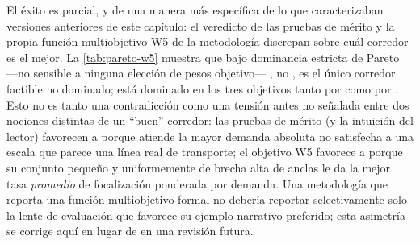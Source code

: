 El éxito es parcial, y de una manera más específica de lo que caracterizaban versiones
anteriores de este capítulo: el veredicto de las pruebas de mérito y la propia función
multiobjetivo W5 de la metodología discrepan sobre cuál corredor es el mejor. La
\cref{tab:pareto-w5} muestra que bajo dominancia estricta de Pareto ---no sensible a
ninguna elección de pesos objetivo--- , no , es el único
corredor factible no dominado;  está dominado en los tres objetivos tanto
por  como por . Esto no es tanto una contradicción como una
tensión antes no señalada entre dos nociones distintas de un ``buen'' corredor: las
pruebas de mérito (y la intuición del lector) favorecen a  porque atiende
la mayor demanda absoluta no satisfecha a una escala que parece una línea real de
transporte; el objetivo W5 favorece a  porque su conjunto pequeño y
uniformemente de brecha alta de anclas le da la mejor tasa \emph{promedio} de
focalización ponderada por demanda. Una metodología que reporta una función
multiobjetivo formal no debería reportar selectivamente solo la lente de evaluación que
favorece su ejemplo narrativo preferido; esta asimetría se corrige aquí en lugar de en
una revisión futura.

